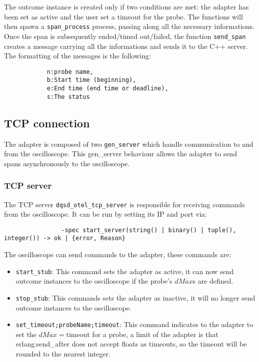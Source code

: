             The outcome instance is created only if two conditions are met: the adapter has been set as active and the user set a timeout for the probe. The functions will then spawn a \texttt{span\_process} process, passing along all the necessary informations. \\
        Once the span is subsequently ended/timed out/failed, the function \texttt{send\_span} creates a message carrying all the informations and sends it to the C++ server. The formatting of the messages is the following:
        \begin{verbatim}
            n:probe name,
            b:Start time (beginning),
            e:End time (end time or deadline),
            s:The status
        \end{verbatim}

    \subsection{TCP connection}
        The adapter is composed of two \texttt{gen\_server} \cite{gen-s} which handle communication to and from the oscilloscope. This gen\_server behaviour allows the adapter to send spans asynchronously to the oscilloscope.

        \subsubsection{TCP server}
            The TCP server \texttt{dqsd\_otel\_tcp\_server} is responsible for receiving commands from the oscilloscope. It can be run by setting its IP and port via:
            \begin{verbatim}
                -spec start_server(string() | binary() | tuple(), integer()) -> ok | {error, Reason}
            \end{verbatim}
            The oscilloscope can send commands to the adapter, these commands are:
            \begin{itemize}
                \item \texttt{start\_stub}: This command sets the adapter as active, it can now send outcome instances to the oscilloscope if the probe's $dMax$s are defined.
                \item \texttt{stop\_stub}: This commands sets the adapter as inactive, it will no longer send outcome instances to the oscilloscope.
                \item \texttt{set\_timeout;probeName;timeout}: This command indicates to the adapter to set the $dMax = \text{timeout}$ for a probe, a limit of the adapter is that erlang:send\_after does not accept floats as timeouts, so the timeout will be rounded to the nearest integer.
            \end{itemize}

